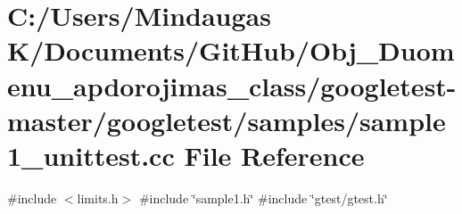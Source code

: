\hypertarget{googletest-master_2googletest_2samples_2sample1__unittest_8cc}{}\section{C\+:/\+Users/\+Mindaugas K/\+Documents/\+Git\+Hub/\+Obj\+\_\+\+Duomenu\+\_\+apdorojimas\+\_\+class/googletest-\/master/googletest/samples/sample1\+\_\+unittest.cc File Reference}
\label{googletest-master_2googletest_2samples_2sample1__unittest_8cc}
{\ttfamily \#include $<$limits.\+h$>$}\newline
{\ttfamily \#include \char`\"{}sample1.\+h\char`\"{}}\newline
{\ttfamily \#include \char`\"{}gtest/gtest.\+h\char`\"{}}\newline
